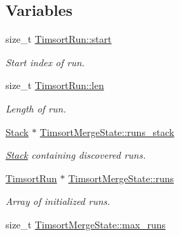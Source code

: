 \subsection*{Variables}
\begin{DoxyCompactItemize}
\item 
\mbox{\label{group__SimpleSorts_ga8e8eeaff3401b5d5f29b73f9007475b5}} 
size\+\_\+t \hyperlink{group__SimpleSorts_ga8e8eeaff3401b5d5f29b73f9007475b5}{Timsort\+Run\+::start}
\begin{DoxyCompactList}\small\item\em Start index of run. \end{DoxyCompactList}\item 
\mbox{\label{group__SimpleSorts_ga90c1a2b4de2a6132ba3e1a06ce8d715f}} 
size\+\_\+t \hyperlink{group__SimpleSorts_ga90c1a2b4de2a6132ba3e1a06ce8d715f}{Timsort\+Run\+::len}
\begin{DoxyCompactList}\small\item\em Length of run. \end{DoxyCompactList}\item 
\mbox{\label{group__SimpleSorts_ga4cde6b50acb89f6a6d71b19475502209}} 
\hyperlink{structStack}{Stack} $\ast$ \hyperlink{group__SimpleSorts_ga4cde6b50acb89f6a6d71b19475502209}{Timsort\+Merge\+State\+::runs\+\_\+stack}
\begin{DoxyCompactList}\small\item\em \hyperlink{structStack}{Stack} containing discovered runs. \end{DoxyCompactList}\item 
\mbox{\label{group__SimpleSorts_ga4eb61fa3007911eeeabe210681e05a16}} 
\hyperlink{structTimsortRun}{Timsort\+Run} $\ast$ \hyperlink{group__SimpleSorts_ga4eb61fa3007911eeeabe210681e05a16}{Timsort\+Merge\+State\+::runs}
\begin{DoxyCompactList}\small\item\em Array of initialized runs. \end{DoxyCompactList}\item 
\mbox{\label{group__SimpleSorts_ga7a2c909e984e074738fec5870da174aa}} 
size\+\_\+t \hyperlink{group__SimpleSorts_ga7a2c909e984e074738fec5870da174aa}{Timsort\+Merge\+State\+::max\+\_\+runs}

\end{DoxyCompactItemize}
